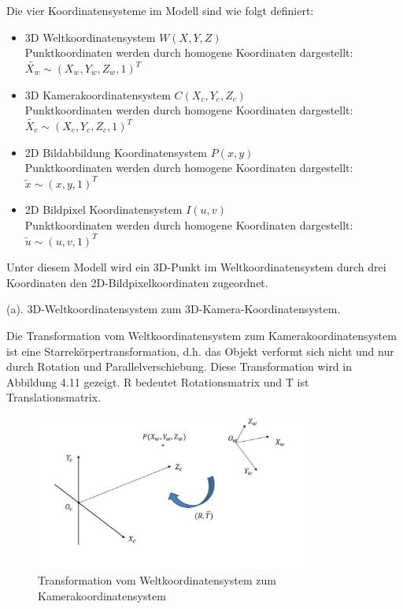 Die vier Koordinatensysteme im Modell sind wie folgt definiert:

\begin{itemize}
	\item 3D Weltkoordinatensystem $W(X,Y,Z)$ \\
	Punktkoordinaten werden durch homogene Koordinaten dargestellt: $\widetilde{X_w}\sim(X_w,Y_w,Z_w,1)^T$
	\item 3D Kamerakoordinatensystem $C(X_c,Y_c,Z_c)$\\
	Punktkoordinaten werden durch homogene Koordinaten dargestellt: $\widetilde{X_c}\sim(X_c,Y_c,Z_c,1)^T$
	\item 2D Bildabbildung Koordinatensystem $P(x,y)$\\
	Punktkoordinaten werden durch homogene Koordinaten dargestellt: $\widetilde{x}\sim(x,y,1)^T$
	\item 2D Bildpixel Koordinatensystem $I(u,v)$\\
	Punktkoordinaten werden durch homogene Koordinaten dargestellt: $\widetilde{u}\sim(u,v,1)^T$
\end{itemize}

Unter diesem Modell wird ein 3D-Punkt im Weltkoordinatensystem durch drei Koordinaten den 2D-Bildpixelkoordinaten zugeordnet.

(a). 3D-Weltkoordinatensystem zum 3D-Kamera-Koordinatensystem.

Die Transformation vom Weltkoordinatensystem zum Kamerakoordinatensystem ist eine Starrekörpertransformation, d.h. das Objekt verformt sich nicht und nur durch Rotation und Parallelverschiebung. Diese Transformation wird in Abbildung 4.11 gezeigt. R bedeutet Rotationsmatrix und T ist Translationsmatrix.

\begin{figure}[htb]
 \centering 
 \includegraphics[keepaspectratio,width=0.8\textwidth]{images/4_ZweiteErfahrung/Kamera/WzuC.pdf}
 \caption{Transformation vom Weltkoordinatensystem zum Kamerakoordinatensystem}
 \label{fig:WzuC}
\end{figure} 

